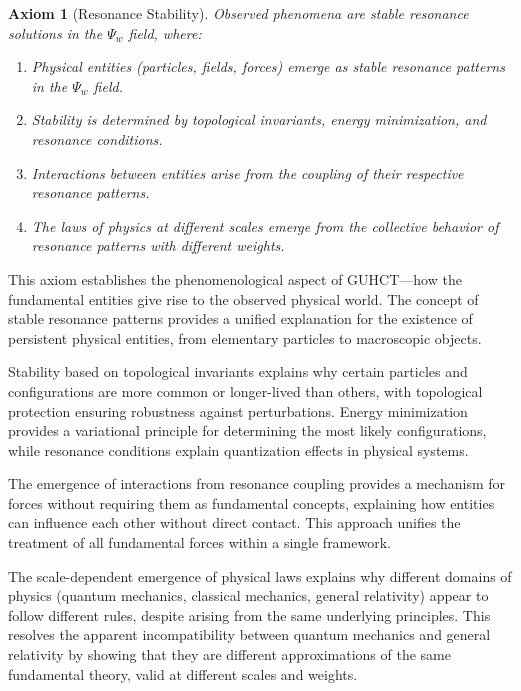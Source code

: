 \documentclass[11pt,a4paper]{article}
\makeatletter
\newtheorem{axiom}[theorem]{Axiom}
\renewenvironment{proof}[1][\proofname]{\par
  \pushQED{\qed}%
  \normalfont \topsep6\p@\@plus6\p@\relax
  \trivlist
  \item[\hskip\labelsep
        \itshape
    #1\@addpunct{.}]\ignorespaces
}{%
  \popQED\endtrivlist\@endpefalse
}
\makeatother
\begin{document}
\begin{axiom}[Resonance Stability]
\label{axiom:resonance_stability}
Observed phenomena are stable resonance solutions in the $\Psi_w$ field, where:
\begin{enumerate}
    \item Physical entities (particles, fields, forces) emerge as stable resonance patterns in the $\Psi_w$ field.
    \item Stability is determined by topological invariants, energy minimization, and resonance conditions.
    \item Interactions between entities arise from the coupling of their respective resonance patterns.
    \item The laws of physics at different scales emerge from the collective behavior of resonance patterns with different weights.
\end{enumerate}
\end{axiom}

\begin{proof}[Justification]
This axiom establishes the phenomenological aspect of GUHCT—how the fundamental entities give rise to the observed physical world. The concept of stable resonance patterns provides a unified explanation for the existence of persistent physical entities, from elementary particles to macroscopic objects.

Stability based on topological invariants explains why certain particles and configurations are more common or longer-lived than others, with topological protection ensuring robustness against perturbations. Energy minimization provides a variational principle for determining the most likely configurations, while resonance conditions explain quantization effects in physical systems.

The emergence of interactions from resonance coupling provides a mechanism for forces without requiring them as fundamental concepts, explaining how entities can influence each other without direct contact. This approach unifies the treatment of all fundamental forces within a single framework.

The scale-dependent emergence of physical laws explains why different domains of physics (quantum mechanics, classical mechanics, general relativity) appear to follow different rules, despite arising from the same underlying principles. This resolves the apparent incompatibility between quantum mechanics and general relativity by showing that they are different approximations of the same fundamental theory, valid at different scales and weights.
\end{proof}
\end{document}
